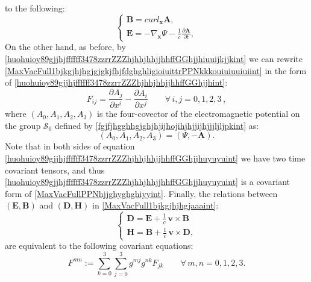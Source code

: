 \documentclass{article}
\theoremstyle{definition}
\theoremstyle{remark}
\renewcommand{\vec}[1]{\mathbf{#1}}
\newcommand{\er}{\eqref}
\newcommand{\er}{\eqref}
\begin{document}
to the following:
\begin{equation}\label{MaxVacFull1bjkgjhjhgjgjgkjfhjfdghghligioiuittrPPNkkkouiuiuuiuiint}
\begin{cases}
\vec B= curl_{\vec x} \vec A,\\
\vec E=-\nabla_{\vec x}\Psi-\frac{1}{c}\frac{\partial\vec
A}{\partial t},
\end{cases}
\end{equation}
On the other hand, as before, by
\er{huohuioy89gjjhjffffff3478zzrrZZZhjhhjhhjjhhffGGhjjhiuuijkjjkint}
we can rewrite
\er{MaxVacFull1bjkgjhjhgjgjgkjfhjfdghghligioiuittrPPNkkkouiuiuuiuiint}
in the form of
\er{huohuioy89gjjhjffffff3478zzrrZZZhjhhjhhjjhhffGGhjjhint}:
\begin{equation}\label{huohuioy89gjjhjffffff3478zzrrZZZhjhhjhhjjhhffGGhjjhuyuyuint}
F_{ij}=\frac{\partial A_j}{\partial x^i}-\frac{\partial
A_i}{\partial x^j}\quad\quad\forall\, i,j=0,1,2,3\,,
\end{equation}
where $(A_0,A_1,A_2,A_3)$ is the four-covector of the
electromagnetic potential on the group $\mathcal{S}_0$ defined by
\er{fgjfjhgghhgjghjhjijhojihjhjjijhjjjljljpkint} as:
\begin{equation}\label{fgjfjhgghhgjghjhjijhojihjhjjijhjjjljljpkyuuyyuint}
(A_0,A_1,A_2,A_3)=(\Psi,-\vec A).
\end{equation}
Note that in both sides of equation
\er{huohuioy89gjjhjffffff3478zzrrZZZhjhhjhhjjhhffGGhjjhuyuyuint} we
have two time covariant tensors, and thus
\er{huohuioy89gjjhjffffff3478zzrrZZZhjhhjhhjjhhffGGhjjhuyuyuint} is
a covariant form of \er{MaxVacFullPPNhjjghyghghiyyint}. Finally,
the relations between $(\vec E,\vec B)$ and $(\vec D,\vec H)$ in
\er{MaxVacFull1bjkgjhjhgjaaaint}:
\begin{equation}\label{MaxVacFullPPNhjjghojjkjkiouint}
\begin{cases}
\vec D=\vec E+\frac{1}{c}\,\vec v\times
\vec B\\
\vec H=\vec B+\frac{1}{c}\,\vec v\times \vec D,
\end{cases}
\end{equation}
are equivalent to the following covariant equations:
\begin{equation}\label{fgjfjhgghhgjghjhjkkkkgjghghuiiiulkkjlkklKKkjkjint}
F^{mn}:=\sum_{k=0}^{3}\sum_{j=0}^{3}g^{mj}g^{nk}F_{jk}
\quad\quad\forall\, m,n=0,1,2,3.
\end{equation}
\end{document}
